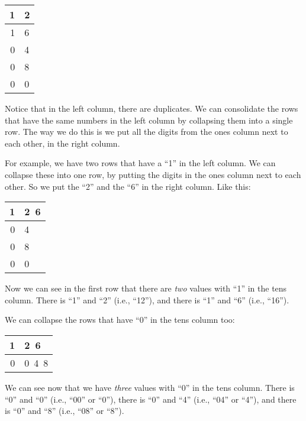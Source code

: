 \documentclass[../../../main.tex]{subfiles}
\begin{document}
\begin{center}
  \begin{tabular}{| r | l |}
    \hline
    1 & 2 \\ \hline
    1 & 6 \\ \hline
    0 & 4 \\ \hline
    0 & 8 \\ \hline
    0 & 0 \\ \hline    
  \end{tabular}
\end{center}

Notice that in the left column, there are duplicates. We can consolidate the rows that have the same numbers in the left column by collapsing them into a single row. The way we do this is we put all the digits from the ones column next to each other, in the right column. 

For example, we have two rows that have a ``1'' in the left column. We can collapse these into one row, by putting the digits in the ones column next to each other. So we put the ``2'' and the ``6'' in the right column. Like this:

\begin{center}
  \begin{tabular}{| r | l |}
    \hline
    1 & 2~6 \\ \hline
    0 & 4 \\ \hline
    0 & 8 \\ \hline
    0 & 0 \\ \hline    
  \end{tabular}
\end{center}

Now we can see in the first row that there are \emph{two} values with ``1'' in the tens column. There is ``1'' and ``2'' (i.e., ``12''), and there is ``1'' and ``6'' (i.e., ``16'').

We can collapse the rows that have ``0'' in the tens column too:

\begin{center}
  \begin{tabular}{| r | l |}
    \hline
    1 & 2~6 \\ \hline
    0 & 0~4~8 \\ \hline
  \end{tabular}
\end{center}

We can see now that we have \emph{three} values with ``0'' in the tens column. There is ``0'' and ``0'' (i.e., ``00'' or ``0''), there is ``0'' and ``4'' (i.e., ``04'' or ``4''), and there is ``0'' and ``8'' (i.e., ``08'' or ``8''). 
\end{document}
